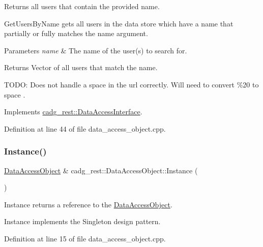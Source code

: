 Returns all users that contain the provided name. 

Get\+Users\+By\+Name gets all users in the data store which have a name that partially or fully matches the name argument.


\begin{DoxyParams}{Parameters}
{\em name} & The name of the user(s) to search for. \\
\hline
\end{DoxyParams}
\begin{DoxyReturn}{Returns}
Vector of all users that match the name.
\end{DoxyReturn}
T\+O\+DO\+: Does not handle a space \textquotesingle{} \textquotesingle{} in the url correctly. Will need to convert \textquotesingle{}\%20\textquotesingle{} to space \textquotesingle{} \textquotesingle{}. 

Implements \mbox{\hyperlink{classcadg__rest_1_1_data_access_interface_ae6cf7e7fad98f27ffc797a9bf5a6b7df}{cadg\+\_\+rest\+::\+Data\+Access\+Interface}}.



Definition at line 44 of file data\+\_\+access\+\_\+object.\+cpp.

\mbox{\label{classcadg__rest_1_1_data_access_object_a7daee562f5c70bfe2ad1989115f8f97e}} 
\subsubsection{\texorpdfstring{Instance()}{Instance()}}
{\footnotesize\ttfamily \mbox{\hyperlink{classcadg__rest_1_1_data_access_object}{Data\+Access\+Object}} \& cadg\+\_\+rest\+::\+Data\+Access\+Object\+::\+Instance (\begin{DoxyParamCaption}{ }\end{DoxyParamCaption})\hspace{0.3cm}{\ttfamily [static]}}



Instance returns a reference to the \mbox{\hyperlink{classcadg__rest_1_1_data_access_object}{Data\+Access\+Object}}. 

Instance implements the Singleton design pattern. 

Definition at line 15 of file data\+\_\+access\+\_\+object.\+cpp.

